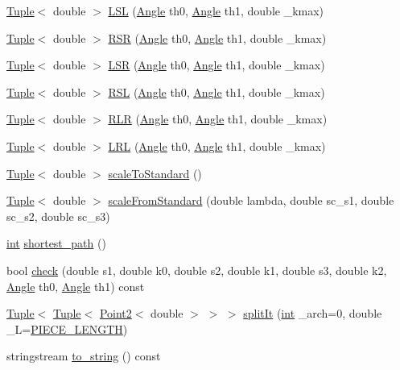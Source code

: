 \begin{DoxyCompactItemize}
\mbox{\hyperlink{class_tuple}{Tuple}}$<$ double $>$ \mbox{\hyperlink{class_dubins_a5a153104d874036205068b703f03240a}{L\+SL}} (\mbox{\hyperlink{class_angle}{Angle}} th0, \mbox{\hyperlink{class_angle}{Angle}} th1, double \+\_\+kmax)
\item 
\mbox{\hyperlink{class_tuple}{Tuple}}$<$ double $>$ \mbox{\hyperlink{class_dubins_acf4e7982a9faff05db4cff0b09d5ecc7}{R\+SR}} (\mbox{\hyperlink{class_angle}{Angle}} th0, \mbox{\hyperlink{class_angle}{Angle}} th1, double \+\_\+kmax)
\item 
\mbox{\hyperlink{class_tuple}{Tuple}}$<$ double $>$ \mbox{\hyperlink{class_dubins_a5f2d7cc94c731253dee1c5b668ab2029}{L\+SR}} (\mbox{\hyperlink{class_angle}{Angle}} th0, \mbox{\hyperlink{class_angle}{Angle}} th1, double \+\_\+kmax)
\item 
\mbox{\hyperlink{class_tuple}{Tuple}}$<$ double $>$ \mbox{\hyperlink{class_dubins_ab7e43f4565146912615837d5ef758cc2}{R\+SL}} (\mbox{\hyperlink{class_angle}{Angle}} th0, \mbox{\hyperlink{class_angle}{Angle}} th1, double \+\_\+kmax)
\item 
\mbox{\hyperlink{class_tuple}{Tuple}}$<$ double $>$ \mbox{\hyperlink{class_dubins_a09a20074da623512c1a7a0cc68ad0dcb}{R\+LR}} (\mbox{\hyperlink{class_angle}{Angle}} th0, \mbox{\hyperlink{class_angle}{Angle}} th1, double \+\_\+kmax)
\item 
\mbox{\hyperlink{class_tuple}{Tuple}}$<$ double $>$ \mbox{\hyperlink{class_dubins_ac07e1eb3ab336641a275c28423658155}{L\+RL}} (\mbox{\hyperlink{class_angle}{Angle}} th0, \mbox{\hyperlink{class_angle}{Angle}} th1, double \+\_\+kmax)
\item 
\mbox{\hyperlink{class_tuple}{Tuple}}$<$ double $>$ \mbox{\hyperlink{class_dubins_afecc4ffa89c5f3952b1729edb87ac88c}{scale\+To\+Standard}} ()
\item 
\mbox{\hyperlink{class_tuple}{Tuple}}$<$ double $>$ \mbox{\hyperlink{class_dubins_a5f4cd38e551fc0e2abdc360459454344}{scale\+From\+Standard}} (double lambda, double sc\+\_\+s1, double sc\+\_\+s2, double sc\+\_\+s3)
\item 
\mbox{\hyperlink{draw_8hh_aa620a13339ac3a1177c86edc549fda9b}{int}} \mbox{\hyperlink{class_dubins_a52681fe06e50899b5296204a312233ce}{shortest\+\_\+path}} ()
\item 
bool \mbox{\hyperlink{class_dubins_ae016db7e7b4c450c0281792608205449}{check}} (double s1, double k0, double s2, double k1, double s3, double k2, \mbox{\hyperlink{class_angle}{Angle}} th0, \mbox{\hyperlink{class_angle}{Angle}} th1) const
\item 
\mbox{\hyperlink{class_tuple}{Tuple}}$<$ \mbox{\hyperlink{class_tuple}{Tuple}}$<$ \mbox{\hyperlink{class_point2}{Point2}}$<$ double $>$ $>$ $>$ \mbox{\hyperlink{class_dubins_a68d6703215b12b2933346efd77563575}{split\+It}} (\mbox{\hyperlink{draw_8hh_aa620a13339ac3a1177c86edc549fda9b}{int}} \+\_\+arch=0, double \+\_\+L=\mbox{\hyperlink{dubins_8hh_a5b2500ca93a5100f73dc442d3cfea7d4}{P\+I\+E\+C\+E\+\_\+\+L\+E\+N\+G\+TH}})
\item 
stringstream \mbox{\hyperlink{class_dubins_a08abdf02352b6d47aafeea1eed9bfbfe}{to\+\_\+string}} () const
\end{DoxyCompactItemize}
